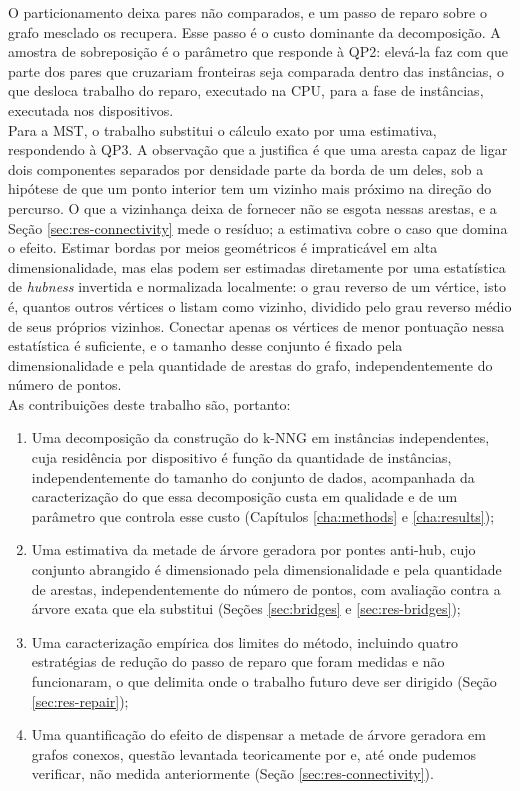 O particionamento deixa pares não comparados, e um passo de reparo sobre o grafo mesclado os recupera. Esse passo é o custo dominante da decomposição. A amostra de sobreposição é o parâmetro que responde à QP2: elevá-la faz com que parte dos pares que cruzariam fronteiras seja comparada dentro das instâncias, o que desloca trabalho do reparo, executado na \ac{CPU}, para a fase de instâncias, executada nos dispositivos.\\

Para a \ac{MST}, o trabalho substitui o cálculo exato por uma estimativa, respondendo à QP3. A observação que a justifica é que uma aresta capaz de ligar dois componentes separados por densidade parte da borda de um deles, sob a hipótese de que um ponto interior tem um vizinho mais próximo na direção do percurso. O que a vizinhança deixa de fornecer não se esgota nessas arestas, e a Seção \ref{sec:res-connectivity} mede o resíduo; a estimativa cobre o caso que domina o efeito. Estimar bordas por meios geométricos é impraticável em alta dimensionalidade, mas elas podem ser estimadas diretamente por uma estatística de \textit{hubness} invertida e normalizada localmente: o grau reverso de um vértice, isto é, quantos outros vértices o listam como vizinho, dividido pelo grau reverso médio de seus próprios vizinhos. Conectar apenas os vértices de menor pontuação nessa estatística é suficiente, e o tamanho desse conjunto é fixado pela dimensionalidade e pela quantidade de arestas do grafo, independentemente do número de pontos.\\

As contribuições deste trabalho são, portanto:\\

\begin{enumerate}
    \item Uma decomposição da construção do \ac{k-NNG} em instâncias independentes, cuja residência por dispositivo é função da quantidade de instâncias, independentemente do tamanho do conjunto de dados, acompanhada da caracterização do que essa decomposição custa em qualidade e de um parâmetro que controla esse custo (Capítulos \ref{cha:methods} e \ref{cha:results});

    \item Uma estimativa da metade de árvore geradora por pontes anti-hub, cujo conjunto abrangido é dimensionado pela dimensionalidade e pela quantidade de arestas, independentemente do número de pontos, com avaliação contra a árvore exata que ela substitui (Seções \ref{sec:bridges} e \ref{sec:res-bridges});

    \item Uma caracterização empírica dos limites do método, incluindo quatro estratégias de redução do passo de reparo que foram medidas e não funcionaram, o que delimita onde o trabalho futuro deve ser dirigido (Seção \ref{sec:res-repair});

    \item Uma quantificação do efeito de dispensar a metade de árvore geradora em grafos conexos, questão levantada teoricamente por  e, até onde pudemos verificar, não medida anteriormente (Seção \ref{sec:res-connectivity}).
\end{enumerate}

